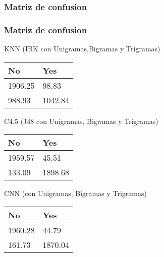\documentclass{beamer}
\begin{document}
\subsubsection{Matriz de confusion}
\begin{frame}
\frametitle{Matriz de confusion}
\item KNN (IBK con Unigramas,Bigramas y Trigramas)

\begin{table}
\begin{center}
\begin{tabular}{ | p{2 cm} | p{2 cm} | }
\toprule
\textbf{No} & \textbf{Yes}\\
\midrule
1906.25 & 98.83\\ \hline
988.93 & 1042.84\\ \hline
\bottomrule
\end{tabular}
\end{center}
\end{table}

\item C4.5 (J48 con Unigramas, Bigramas y Trigramas)

\begin{table}
\begin{center}
\begin{tabular}{ | p{2 cm} | p{2 cm} | }
\toprule
\textbf{No} & \textbf{Yes}\\
\midrule
1959.57 & 45.51\\ \hline
133.09 & 1898.68\\ \hline
\bottomrule
\end{tabular}
\end{center}
\end{table}

\item CNN (con Unigramas, Bigramas y Trigramas)

\begin{table}
\begin{center}
\begin{tabular}{ | p{2 cm} | p{2 cm} | }
\toprule
\textbf{No} & \textbf{Yes}\\
\midrule
1960.28 & 44.79\\ \hline
161.73 & 1870.04\\ \hline
\bottomrule
\end{tabular}
\end{center}
\end{table}

\end{frame}
\end{document}
